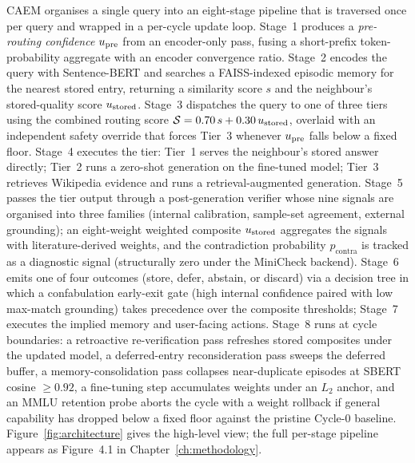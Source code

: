 CAEM organises a single query into an eight-stage pipeline that is traversed once per query and wrapped in a per-cycle update loop. Stage~1 produces a \textit{pre-routing confidence} $u_{\text{pre}}$ from an encoder-only pass, fusing a short-prefix token-probability aggregate with an encoder convergence ratio. Stage~2 encodes the query with Sentence-BERT and searches a FAISS-indexed episodic memory for the nearest stored entry, returning a similarity score $s$ and the neighbour's stored-quality score $u_{\text{stored}}$. Stage~3 dispatches the query to one of three tiers using the combined routing score $\mathcal{S} = 0.70\,s + 0.30\,u_{\text{stored}}$, overlaid with an independent safety override that forces Tier~3 whenever $u_{\text{pre}}$ falls below a fixed floor. Stage~4 executes the tier: Tier~1 serves the neighbour's stored answer directly; Tier~2 runs a zero-shot generation on the fine-tuned model; Tier~3 retrieves Wikipedia evidence and runs a retrieval-augmented generation. Stage~5 passes the tier output through a post-generation verifier whose nine signals are organised into three families (internal calibration, sample-set agreement, external grounding); an eight-weight weighted composite $u_{\text{stored}}$ aggregates the signals with literature-derived weights, and the contradiction probability $p_{\text{contra}}$ is tracked as a diagnostic signal (structurally zero under the MiniCheck backend). Stage~6 emits one of four outcomes (store, defer, abstain, or discard) via a decision tree in which a confabulation early-exit gate (high internal confidence paired with low max-match grounding) takes precedence over the composite thresholds; Stage~7 executes the implied memory and user-facing actions. Stage~8 runs at cycle boundaries: a retroactive re-verification pass refreshes stored composites under the updated model, a deferred-entry reconsideration pass sweeps the deferred buffer, a memory-consolidation pass collapses near-duplicate episodes at SBERT cosine $\geq 0.92$, a fine-tuning step accumulates weights under an $L_{2}$ anchor, and an MMLU retention probe aborts the cycle with a weight rollback if general capability has dropped below a fixed floor against the pristine Cycle-0 baseline. Figure~\ref{fig:architecture} gives the high-level view; the full per-stage pipeline appears as Figure~4.1 in Chapter~\ref{ch:methodology}.

